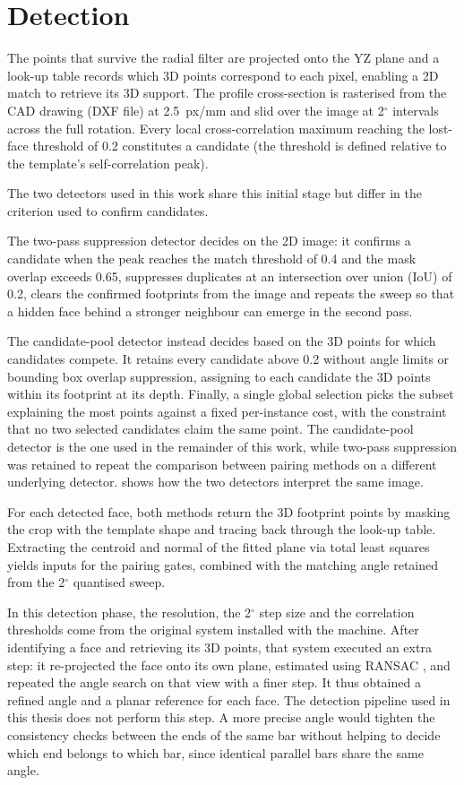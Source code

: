 \documentclass[a4paper, 12pt, twoside]{book}
\newcommand{\citev}[1]{\citeauthor{#1} \citeyear{#1} \cite{#1}}
\begin{document}
\section{Detection}
\label{sec:setting-detection}

The points that survive the radial filter are projected onto the YZ plane and a look-up table records which 3D points correspond to each pixel, enabling a 2D match to retrieve its 3D support.
The profile cross-section is rasterised from the CAD drawing (DXF file) at 2.5~px/mm and slid over the image at 2$^\circ$ intervals across the full rotation. Every local cross-correlation maximum reaching the lost-face threshold of 0.2 constitutes a candidate (the threshold is defined relative to the template's self-correlation peak).

The two detectors used in this work share this initial stage but differ in the criterion used to confirm candidates.

The two-pass suppression detector decides on the 2D image: it confirms a candidate when the peak reaches the match threshold of 0.4 and the mask overlap exceeds 0.65, suppresses duplicates at an intersection over union (IoU) of 0.2, clears the confirmed footprints from the image and repeats the sweep so that a hidden face behind a stronger neighbour can emerge in the second pass.

The candidate-pool detector instead decides based on the 3D points for which candidates compete. It retains every candidate above 0.2 without angle limits or bounding box overlap suppression, assigning to each candidate the 3D points within its footprint at its depth. Finally, a single global selection picks the subset explaining the most points against a fixed per-instance cost, with the constraint that no two selected candidates claim the same point. The candidate-pool detector is the one used in the remainder of this work, while two-pass suppression was retained to repeat the comparison between pairing methods on a different underlying detector.  shows how the two detectors interpret the same image.

For each detected face, both methods return the 3D footprint points by masking the crop with the template shape and tracing back through the look-up table. Extracting the centroid and normal of the fitted plane via total least squares yields inputs for the pairing gates, combined with the matching angle retained from the 2$^\circ$ quantised sweep.

In this detection phase, the resolution, the 2$^\circ$ step size and the correlation thresholds come from the original system installed with the machine. After identifying a face and retrieving its 3D points, that system executed an extra step: it re-projected the face onto its own plane, estimated using RANSAC \citev{fischler1981}, and repeated the angle search on that view with a finer step. It thus obtained a refined angle and a planar reference for each face.
The detection pipeline used in this thesis does not perform this step. A more precise angle would tighten the consistency checks between the ends of the same bar without helping to decide which end belongs to which bar, since identical parallel bars share the same angle.
\end{document}
